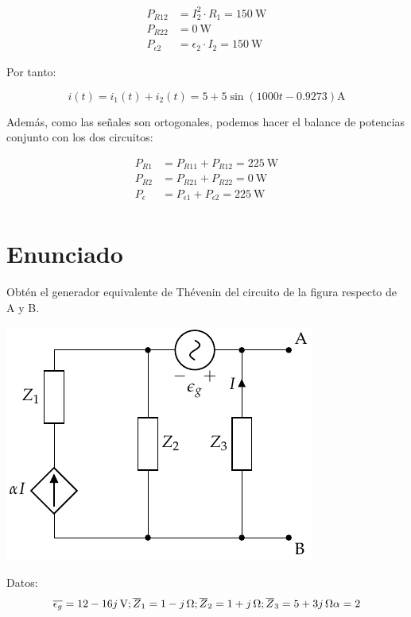 \begin{align*}
  P_{R12} &= I_2^2 \cdot R_1 = \qty{150}{\watt}\\
  P_{R22} &= \qty{0}{\watt}\\
  P_{\epsilon2} &= \epsilon_2 \cdot I_2 = \qty{150}{\watt}
\end{align*}

Por tanto:

\begin{equation*}
  i(t) = i_1(t) + i_2(t) = 5 + 5\sin(1000t - 0.9273)\si{\ampere}
\end{equation*}

Además, como las señales son ortogonales, podemos hacer el balance de potencias conjunto con los dos circuitos:

\begin{align*}
  P_{R1} &= P_{R11} + P_{R12} = \qty{225}{\watt}\\
  P_{R2} &= P_{R21} + P_{R22} = \qty{0}{\watt}\\
  P_{\epsilon} &= P_{\epsilon1} + P_{\epsilon2} = \qty{225}{\watt}\\
\end{align*}
\section{Enunciado}
Obtén el generador equivalente de Thévenin del circuito de la figura respecto de A y B.

\begin{center}
\includegraphics{figuras/Thevenin4}
\end{center}

Datos:
\begin{equation*}
  \overline{\epsilon_g} = \qty[parse-numbers=false]{12 - 16j}{\volt};
  \overline{Z}_1 = \qty[parse-numbers=false]{1 - j}{\ohm};
  \overline{Z}_2 = \qty[parse-numbers=false]{1 + j}{\ohm};
  \overline{Z}_3 = \qty[parse-numbers=false]{5 + 3j}{\ohm}
  \alpha = 2
\end{equation*}


